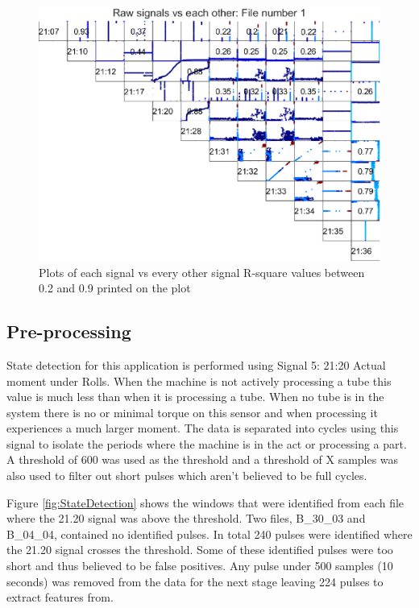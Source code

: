 \documentclass{article}
\begin{document}
\begin{figure}[H]
    \centering
    \includegraphics[width=\textwidth, height=\textheight, keepaspectratio]{figures/RawSignalCorrelationsFile1.eps}
    \caption{Plots of each signal vs every other signal R-square values between 0.2 and 0.9 printed on the plot}
    \label{fig:RawSignalCorrelationsFile1}
\end{figure}

\subsection{Pre-processing}
State detection for this application is performed using Signal 5: 21:20 Actual moment under Rolls. When the machine is not actively processing a tube this value is much less than when it is processing a tube. When no tube is in the system there is no or minimal torque on this sensor and when processing it experiences a much larger moment.
The data is separated into cycles using this signal to isolate the periods where the machine is in the act or processing a part. A threshold of 600 was used as the threshold and a threshold of X samples was also used to filter out short pulses which aren't believed to be full cycles.

Figure \ref{fig:StateDetection} shows the windows that were identified from each file where the 21.20 signal was above the threshold. Two files, B\_30\_03 and B\_04\_04, contained no identified pulses. In total 240 pulses were identified where the 21.20 signal crosses the threshold. Some of these identified pulses were too short and thus believed to be false positives. Any pulse under 500 samples (10 seconds) was removed from the data for the next stage leaving 224 pulses to extract features from.
\end{document}
